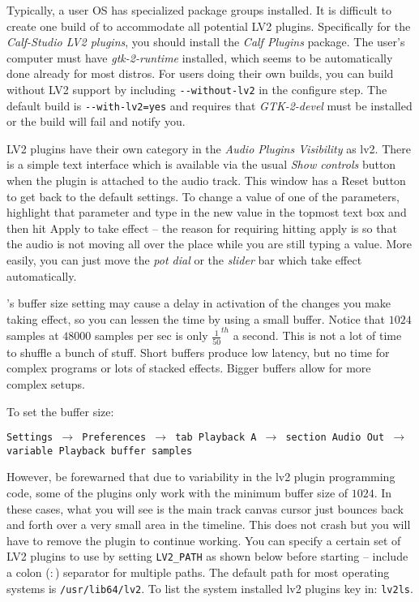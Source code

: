 Typically, a user OS has specialized package groups installed. It is difficult to create one build of \CGG{} to accommodate all potential LV2 plugins. Specifically for the \textit{Calf-Studio LV2 plugins}, you should install the \textit{Calf Plugins} package. The user’s computer must have \textit{gtk-2-runtime} installed, which seems to be automatically done already for most distros. For users doing their own builds, you can build \CGG{} without LV2 support by including \texttt{-{}-without-lv2} in the configure step. The default build is \texttt{-{}-with-lv2=yes} and requires that \textit{GTK-2-devel} must be installed or the build will fail and notify you.

LV2 plugins have their own category in the \textit{Audio Plugins Visibility} as lv2. There is a simple text interface which is available via the usual \textit{Show controls} button when the plugin is attached to the audio track. This window has a Reset button to get back to the default settings. To change a value of one of the parameters, highlight that parameter and type in the new value in the topmost text box and then hit Apply to take effect -- the reason for requiring hitting apply is so that the audio is not moving all over the place while you are still typing a value. More easily, you can just move the \textit{pot dial} or the \textit{slider} bar which take effect automatically.

\CGG{}’s buffer size setting may cause a delay in activation of the changes you make taking effect, so you can lessen the time by using a small buffer. Notice that $1024$ samples at $48000$ samples per sec is only $\frac{1}{50}^{th}$ a second. This is not a lot of time to shuffle a bunch of stuff. Short buffers produce low latency, but no time for complex programs or lots of stacked effects. Bigger buffers allow for more complex setups.

To set the buffer size:

\texttt{Settings $\rightarrow$ Preferences $\rightarrow$ tab Playback A $\rightarrow$ section Audio Out $\rightarrow$ variable Playback buffer samples}

However, be forewarned that due to variability in the lv2 plugin programming code, some of the plugins only work with the minimum buffer size of $1024$. In these cases, what you will see is the main track canvas cursor just bounces back and forth over a very small area in the timeline. This does not crash \CGG{} but you will have to remove the plugin to continue working.
You can specify a certain set of LV2 plugins to use by setting \texttt{LV2\_PATH} as shown below before starting \CGG{} -- include a colon ($:$) separator for multiple paths. The default path for most operating systems is \texttt{/usr/lib64/lv2}. To list the system installed lv2 plugins key in: \texttt{lv2ls}.

